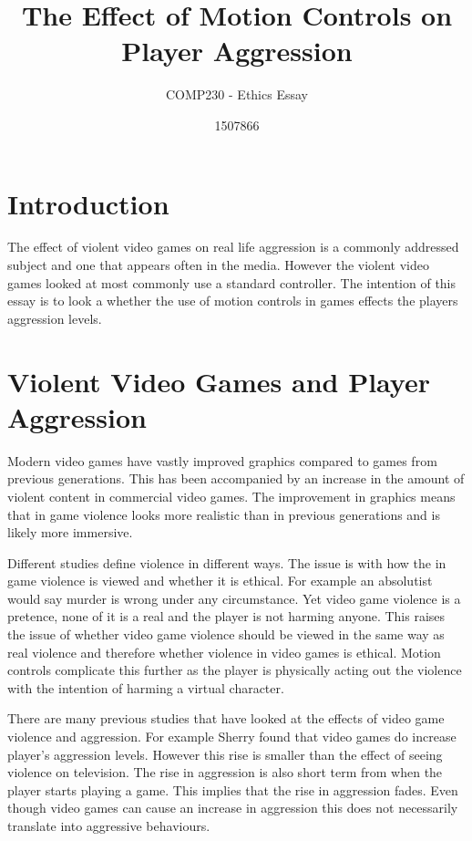 \documentclass{scrartcl}
\title{The Effect of Motion Controls on Player Aggression }
\subtitle{COMP230 - Ethics Essay}
\author{1507866}
\begin{document}
	
\maketitle
	
	
\section{Introduction}
The effect of violent video games on real life aggression is a commonly addressed subject and one that appears often in the media. However the violent video games looked at most commonly use a standard controller. The intention of this essay is to look a whether the use of motion controls in games effects the players aggression levels.


\section{Violent Video Games and Player Aggression}
 
Modern video games have vastly improved graphics compared to games from previous generations.  \cite{Fumhe}  This has been accompanied by an increase in the amount of violent content in commercial video games. \cite{Fumhe} The improvement in graphics means that in game violence looks more realistic than in previous generations and is likely more immersive. 

\bigskip
Different studies define violence in different ways. The issue is with how the in game violence is viewed and whether it is ethical. For example an absolutist would say murder is wrong under any circumstance. \cite{forsyth}
Yet video game violence is a pretence, none of it is a real and the player is not harming anyone. \cite{Tavinor}
This raises the issue of whether video game violence should be viewed in the same way as real violence and therefore whether violence in video games is ethical. Motion controls complicate this further as the player is physically acting out the violence with the intention of harming a virtual character. 

\bigskip
There are many previous studies that have looked at the effects of video game violence and aggression. For example Sherry found that video games do increase player's aggression levels. However this rise is smaller than the effect of seeing violence on television.  \cite{sherry2001effects}
The rise in aggression is also short term from when the player starts playing a game. This implies that the rise in aggression fades. Even though video games can cause an increase in aggression this does not necessarily translate into aggressive behaviours.  \cite{Ferguson}  
\end{document}
